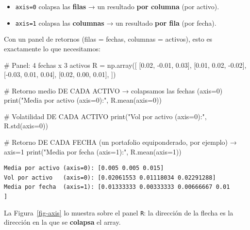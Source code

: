 \documentclass[
  spanish,
  letterpaper,
  DIV=11,
  numbers=noendperiod]{scrreprt}
\newenvironment{Shaded}{\begin{snugshade}}{\end{snugshade}}
\newcommand{\BuiltInTok}[1]{\textcolor[rgb]{0.00,0.23,0.31}{#1}}
\newcommand{\CommentTok}[1]{\textcolor[rgb]{0.37,0.37,0.37}{#1}}
\newcommand{\DecValTok}[1]{\textcolor[rgb]{0.68,0.00,0.00}{#1}}
\newcommand{\FloatTok}[1]{\textcolor[rgb]{0.68,0.00,0.00}{#1}}
\newcommand{\NormalTok}[1]{\textcolor[rgb]{0.00,0.23,0.31}{#1}}
\newcommand{\OperatorTok}[1]{\textcolor[rgb]{0.37,0.37,0.37}{#1}}
\newcommand{\StringTok}[1]{\textcolor[rgb]{0.13,0.47,0.30}{#1}}
\providecommand{\tightlist}{%
  \setlength{\itemsep}{0pt}\setlength{\parskip}{0pt}}
\begin{document}
\begin{itemize}
\tightlist
\item
  \texttt{axis=0} colapsa las \textbf{filas} → un resultado \textbf{por
  columna} (por activo).
\item
  \texttt{axis=1} colapsa las \textbf{columnas} → un resultado
  \textbf{por fila} (por fecha).
\end{itemize}

Con un panel de retornos (filas = fechas, columnas = activos), esto es
exactamente lo que necesitamos:

\label{axis}
\begin{Shaded}
\begin{Highlighting}[]
\CommentTok{\# Panel: 4 fechas x 3 activos}
\NormalTok{R }\OperatorTok{=}\NormalTok{ np.array([}
\NormalTok{    [}\FloatTok{0.02}\NormalTok{, }\OperatorTok{{-}}\FloatTok{0.01}\NormalTok{,  }\FloatTok{0.03}\NormalTok{],}
\NormalTok{    [}\FloatTok{0.01}\NormalTok{,  }\FloatTok{0.02}\NormalTok{, }\OperatorTok{{-}}\FloatTok{0.02}\NormalTok{],}
\NormalTok{    [}\OperatorTok{{-}}\FloatTok{0.03}\NormalTok{, }\FloatTok{0.01}\NormalTok{,  }\FloatTok{0.04}\NormalTok{],}
\NormalTok{    [}\FloatTok{0.02}\NormalTok{,  }\FloatTok{0.00}\NormalTok{,  }\FloatTok{0.01}\NormalTok{],}
\NormalTok{])}

\CommentTok{\# Retorno medio DE CADA ACTIVO → colapsamos las fechas (axis=0)}
\BuiltInTok{print}\NormalTok{(}\StringTok{"Media por activo (axis=0):"}\NormalTok{, R.mean(axis}\OperatorTok{=}\DecValTok{0}\NormalTok{))}

\CommentTok{\# Volatilidad DE CADA ACTIVO}
\BuiltInTok{print}\NormalTok{(}\StringTok{"Vol por activo   (axis=0):"}\NormalTok{, R.std(axis}\OperatorTok{=}\DecValTok{0}\NormalTok{))}

\CommentTok{\# Retorno DE CADA FECHA (un portafolio equiponderado, por ejemplo) → axis=1}
\BuiltInTok{print}\NormalTok{(}\StringTok{"Media por fecha  (axis=1):"}\NormalTok{, R.mean(axis}\OperatorTok{=}\DecValTok{1}\NormalTok{))}
\end{Highlighting}
\end{Shaded}

\begin{verbatim}
Media por activo (axis=0): [0.005 0.005 0.015]
Vol por activo   (axis=0): [0.02061553 0.01118034 0.02291288]
Media por fecha  (axis=1): [0.01333333 0.00333333 0.00666667 0.01      ]
\end{verbatim}

La Figura~\ref{fig-axis} lo muestra sobre el panel \texttt{R}: la
dirección de la flecha es la dirección en la que se \textbf{colapsa} el
array.
\end{document}
